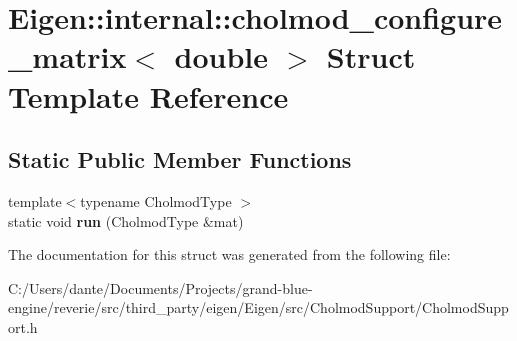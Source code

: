 \hypertarget{struct_eigen_1_1internal_1_1cholmod__configure__matrix_3_01double_01_4}{}\section{Eigen\+::internal\+::cholmod\+\_\+configure\+\_\+matrix$<$ double $>$ Struct Template Reference}
\label{struct_eigen_1_1internal_1_1cholmod__configure__matrix_3_01double_01_4}
\subsection*{Static Public Member Functions}
\begin{DoxyCompactItemize}
\item 
\mbox{\label{struct_eigen_1_1internal_1_1cholmod__configure__matrix_3_01double_01_4_a2070738f3a67504dea541cf1068b61da}} 
{\footnotesize template$<$typename Cholmod\+Type $>$ }\\static void {\bfseries run} (Cholmod\+Type \&mat)
\end{DoxyCompactItemize}


The documentation for this struct was generated from the following file\+:\begin{DoxyCompactItemize}
\item 
C\+:/\+Users/dante/\+Documents/\+Projects/grand-\/blue-\/engine/reverie/src/third\+\_\+party/eigen/\+Eigen/src/\+Cholmod\+Support/Cholmod\+Support.\+h\end{DoxyCompactItemize}

